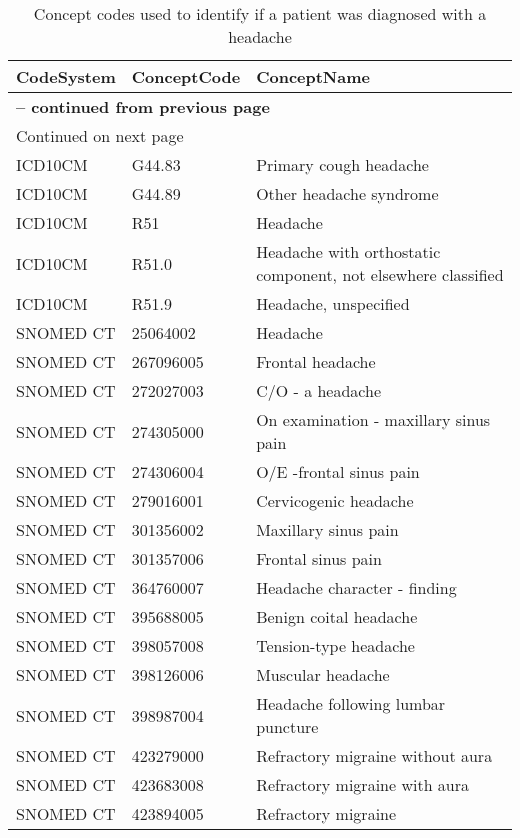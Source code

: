 \begin{longtable}{p{}p{}p{}}
\caption{Concept codes used to identify if a patient was diagnosed with a headache} \\ 
 CodeSystem & ConceptCode & ConceptName \\ 
  \hline 
\endfirsthead 
\multicolumn{3}{p{\textwidth}}{{ \bfseries \tablename \thetable{} -- continued from previous page}} \ 
\hline CodeSystem & ConceptCode & ConceptName \\ \hline 
\endhead 
\hline \multicolumn{3}{p{\textwidth}}{{Continued on next page}} \\ \hline 
\endfoot 
\hline 
\endlastfoot 
 \hline
ICD10CM & G44.83 & Primary cough headache \\ 
  ICD10CM & G44.89 & Other headache syndrome \\ 
  ICD10CM & R51 & Headache \\ 
  ICD10CM & R51.0 & Headache with orthostatic component, not elsewhere classified \\ 
  ICD10CM & R51.9 & Headache, unspecified \\ 
  SNOMED CT & 25064002 & Headache \\ 
  SNOMED CT & 267096005 & Frontal headache \\ 
  SNOMED CT & 272027003 & C/O - a headache \\ 
  SNOMED CT & 274305000 & On examination - maxillary sinus pain \\ 
  SNOMED CT & 274306004 & O/E -frontal sinus pain \\ 
  SNOMED CT & 279016001 & Cervicogenic headache \\ 
  SNOMED CT & 301356002 & Maxillary sinus pain \\ 
  SNOMED CT & 301357006 & Frontal sinus pain \\ 
  SNOMED CT & 364760007 & Headache character - finding \\ 
  SNOMED CT & 395688005 & Benign coital headache \\ 
  SNOMED CT & 398057008 & Tension-type headache \\ 
  SNOMED CT & 398126006 & Muscular headache \\ 
  SNOMED CT & 398987004 & Headache following lumbar puncture \\ 
  SNOMED CT & 423279000 & Refractory migraine without aura \\ 
  SNOMED CT & 423683008 & Refractory migraine with aura \\ 
  SNOMED CT & 423894005 & Refractory migraine \\ 

\end{longtable}
